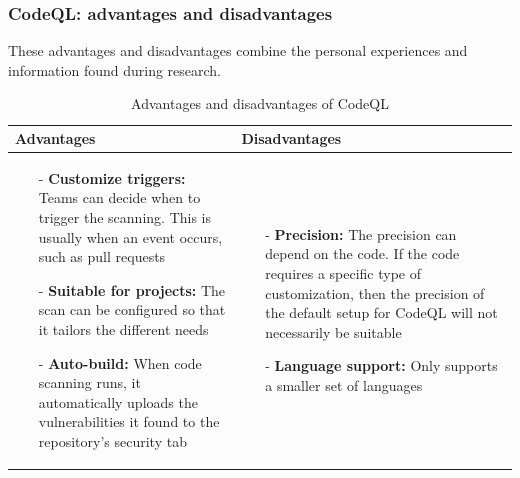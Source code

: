 \subsubsection{CodeQL: advantages and disadvantages}
These advantages and disadvantages combine the personal experiences and information found during research. 
\begin{table}[H]
\centering
\begin{tabular}{|>{\raggedright\arraybackslash}p{6cm}|>{\raggedright\arraybackslash}p{6cm}|}
\hline
\textbf{Advantages} & \textbf{Disadvantages} \\
\hline
\begin{itemize}
\item [-] \textbf{Customize triggers:} Teams can decide when to trigger the scanning. This is usually when an event occurs, such as pull requests
\vspace{5pt}
\item [-]\textbf{Suitable for projects:} The scan can be configured so that it tailors the different needs
\vspace{5pt}
\item [-] \textbf{Auto-build:} When code scanning runs, it automatically uploads the vulnerabilities it found to the repository's security tab
\end{itemize}
&
   \begin{itemize}
\item [-]\textbf{Precision:} The precision can depend on the code. If the code requires a specific type of customization, then the precision of the default setup for CodeQL will not necessarily be suitable 
\vspace{5pt}
\item [-] \textbf{Language support:} Only supports a smaller set of languages 
\end{itemize}
\\
\hline
\end{tabular}
\caption{Advantages and disadvantages of CodeQL}
\label{tab: CodeQL}
\end{table}

